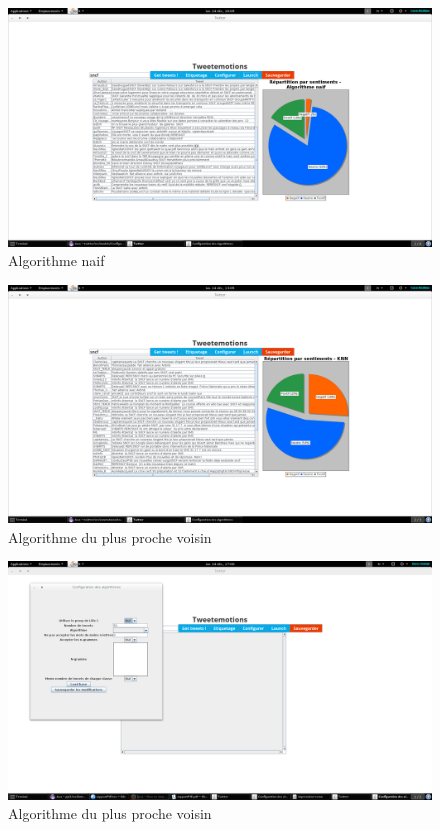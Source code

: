\documentclass[a4paper,10pt]{report}
\begin{document}
      \begin{figure}[H]
	\centering
	\includegraphics[scale=0.2]{impressions-ecran/dico.png}
	\caption{Algorithme naif}
	\label{dico}
      \end{figure}
      \begin{figure}[H]
	\centering
	\includegraphics[scale=0.2]{impressions-ecran/KNN.png}
	\caption{Algorithme du plus proche voisin}
	\label{KNN}
      \end{figure}
      \begin{figure}[H]
	\centering
	\includegraphics[scale=0.2]{impressions-ecran/config.png}
	\caption{Algorithme du plus proche voisin}
	\label{config}
      \end{figure}
      
\end{document}
